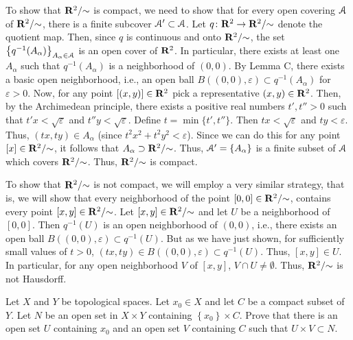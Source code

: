 \begin{solution}
  To show that $\mathbf{R}^2/{\sim}$ is compact, we need to show that for every
  open covering $\mathcal{A}$ of $\mathbf{R}^2/{\sim}$, there is a finite subcover
  $\mathcal{A}'\subset\mathcal{A}$. Let $q\colon\mathbf{R}^2\to\mathbf{R}^2/{\sim}$ denote the
  quotient map. Then, since $q$ is continuous and onto $\mathbf{R}^2/{\sim}$, the
  set $\left\{q^{-1}(A_\alpha)\right\}_{A_\alpha\in\mathcal{A}}$ is an open cover
  of $\mathbf{R}^2$. In particular, there exists at least one $A_\alpha$ such
  that $q^{-1}(A_\alpha)$ is a neighborhood of $(0,0)$. By Lemma C, there
  exists a basic open neighborhood, i.e., an open ball
  $B((0,0),\varepsilon)\subset q^{-1}(A_\alpha)$ for $\varepsilon>0$. Now,
  for any point $[(x,y)]\in\mathbf{R}^2$ pick a representative
  $(x,y)\in\mathbf{R}^2$. Then, by the Archimedean principle, there exists a
  positive real numbers $t',t''>0$ such that $t'x<\sqrt{\varepsilon}$ and
  $t''y<\sqrt{\varepsilon}$. Define $t=\min\{t',t''\}$. Then
  $tx<\sqrt{\varepsilon}$ and $ty<\varepsilon$. Thus, $(tx,ty)\in A_\alpha$
  (since $t^2x^2+t^2y^2<\varepsilon$). Since we can do this for any point
  $[x]\in\mathbf{R}^2/{\sim}$, it follows that
  $A_\alpha\supset\mathbf{R}^2/{\sim}$. Thus, $\mathcal{A}'=\left\{A_\alpha\right\}$ is
  a finite subset of $\mathcal{A}$ which covers $\mathbf{R}^2/{\sim}$. Thus,
  $\mathbf{R}^2/{\sim}$ is compact.

  To show that $\mathbf{R}^2/{\sim}$ is not compact, we will employ a very
  similar strategy, that is, we will show that every neighborhood of the
  point $[0,0]\in\mathbf{R}^2/{\sim}$, contains every point
  $[x,y]\in\mathbf{R}^2/{\sim}$. Let $[x,y]\in\mathbf{R}^2/{\sim}$ and let $U$ be a
  neighborhood of $[0,0]$. Then $q^{-1}(U)$ is an open neighborhood of
  $(0,0)$, i.e., there exists an open ball
  $B((0,0),\varepsilon)\subset q^{-1}(U)$. But as we have just shown, for
  sufficiently small values of $t>0$,
  $(tx,ty)\in B((0,0),\varepsilon)\subset q^{-1}(U)$. Thus, $[x,y]\in
  U$. In particular, for any open neighborhood $V$ of $[x,y]$,
  $V\cap U\neq\emptyset$. Thus, $\mathbf{R}^2/{\sim}$ is not Hausdorff.
\end{solution}
\begin{problem}
  Let $X$ and $Y$ be topological spaces. Let $x_0\in X$ and let $C$ be a
  compact subset of $Y$. Let $N$ be an open set in $X\times Y$ containing
  $\left\{x_0\right\}\times C$. Prove that there is an open set $U$
  containing $x_0$ and an open set $V$ containing $C$ such that
  $U\times V\subset N$.
\end{problem}
